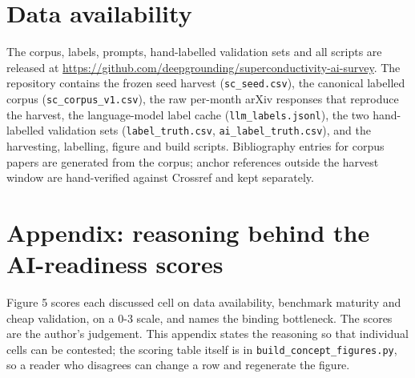 \documentclass[
  11pt,
]{article}
\begin{document}
\section{Data availability}\label{data-availability}

The corpus, labels, prompts, hand-labelled validation sets and all
scripts are released at
\url{https://github.com/deepgrounding/superconductivity-ai-survey}. The
repository contains the frozen seed harvest (\texttt{sc\_seed.csv}), the
canonical labelled corpus (\texttt{sc\_corpus\_v1.csv}), the raw
per-month arXiv responses that reproduce the harvest, the language-model
label cache (\texttt{llm\_labels.jsonl}), the two hand-labelled
validation sets (\texttt{label\_truth.csv},
\texttt{ai\_label\_truth.csv}), and the harvesting, labelling, figure
and build scripts. Bibliography entries for corpus papers are generated
from the corpus; anchor references outside the harvest window are
hand-verified against Crossref and kept separately.

\section{Appendix: reasoning behind the AI-readiness
scores}\label{appendix-reasoning-behind-the-ai-readiness-scores}

Figure 5 scores each discussed cell on data availability, benchmark
maturity and cheap validation, on a 0-3 scale, and names the binding
bottleneck. The scores are the author's judgement. This appendix states
the reasoning so that individual cells can be contested; the scoring
table itself is in \texttt{build\_concept\_figures.py}, so a reader who
disagrees can change a row and regenerate the figure.
\end{document}

